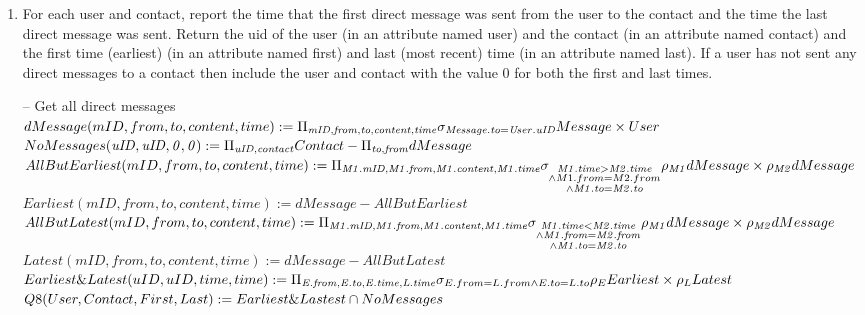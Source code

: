 \documentclass{article}
\newcommand{\var}[1]{\mathit{#1}}
\begin{document}
\begin{enumerate}
{}
\item   %
For each user and contact, report the time that the first direct message was sent from the user to the contact and the time the last direct message was sent. Return the uid of the user (in an attribute named user) and the contact (in an attribute named contact) and the first time (earliest) (in an attribute named first) and last (most recent) time (in an attribute named last). If a user has not
sent any direct messages to a contact then include the user and contact with the value 0 for both the first and last times. \\ [5pt]
\large{
\hspace*{1cm} -- Get all direct messages \\ [5pt]
$
dMessage(mID, from, to, content, time) := \Pi_{\var{mID}, \var{from}, \var{to}, \var{content}, \var{time}} \\
\sigma_{\var{Message.to} = \var{User.uID}} Message \times User \\ [5pt]
$
$
NoMessages(\var{uID }, \var{uID}, \var{0}, \var{0}) := \Pi_{\var{uID}, \var{contact}} \\
 Contact -  \Pi_{\var{to}, \var{from}} dMessage
$
$
AllButEarliest(mID, from, to, content, time) := \Pi_{\var{M1.mID}, \var{M1.from},\\
					\var{M1.content}, \var{M1.time}} \\
					\sigma_{\substack{ \var{M1.time} > \var{M2.time} \\
					\wedge M1.from = M2.from \\
					\wedge \var{M1.to} = \var{M2.to}}} \\
					\rho_{\var{M1}} dMessage \times \rho_{\var{M2}} dMessage
$
$
Earliest(mID, from, to, content, time) := dMessage - AllButEarliest
$
$
AllButLatest(mID, from, to, content, time) := \Pi_{\var{M1.mID}, \var{M1.from}, \\
					\var{M1.content},\var{M1.time}} \\
					\sigma_{\substack{ \var{M1.time} < \var{M2.time} \\
					\wedge \var{M1.from} = \var{M2.from} \\
					\wedge \var{M1.to} = \var{M2.to}}}
					\rho_{\var{M1}} dMessage \times \rho_{\var{M2}} dMessage
$
$
Latest(mID, from, to, content, time) := dMessage - AllButLatest
$
$
Earliest\&Latest(uID, uID, time, time) := \Pi_{\var{E.from}, \var{E.to}, \var{E.time}, \var{L.time}}\\
					\sigma_{\substack{E.from = L.from
					\wedge E.to = L.to}}
					\rho_{E}Earliest \times \rho_{L}Latest
$
$
Q8(User, Contact, First, Last) := Earliest\&Lastest \cap NoMessages  \\ [5pt]
$

}
\end{enumerate}
\end{document}

